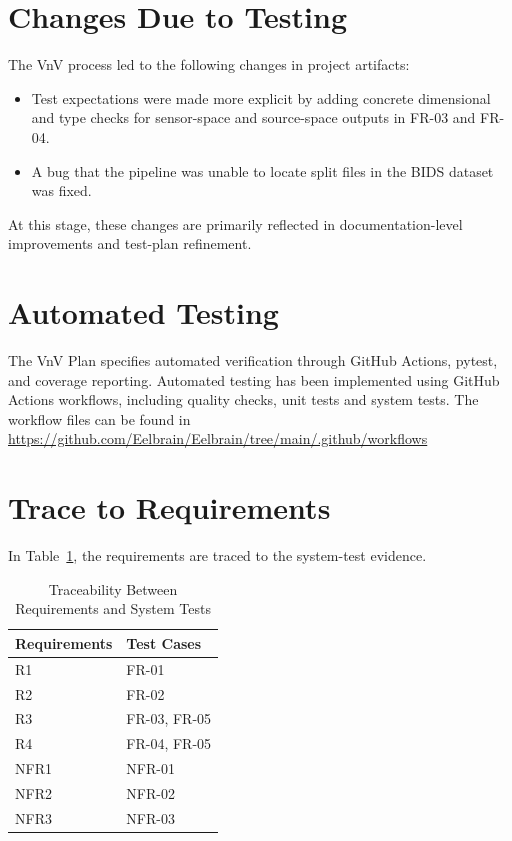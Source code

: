 \documentclass[12pt, titlepage]{article}
\begin{document}
\section{Changes Due to Testing}

The VnV process led to the following changes in project artifacts:
\begin{itemize}
    \item Test expectations were made more explicit by adding concrete dimensional and type checks for sensor-space and source-space outputs in FR-03 and FR-04.
    \item A bug that the pipeline was unable to locate split files in the BIDS dataset was fixed.
\end{itemize}

At this stage, these changes are primarily reflected in documentation-level improvements and test-plan refinement.

\section{Automated Testing}

The VnV Plan specifies automated verification through GitHub Actions, pytest, and coverage reporting.
Automated testing has been implemented using GitHub Actions workflows, including quality checks, unit tests and system tests. The workflow files can be found in \url{https://github.com/Eelbrain/Eelbrain/tree/main/.github/workflows}


\section{Trace to Requirements}
In Table~\ref{tab:requirement_test_trace}, the requirements are traced to the system-test evidence.

\begin{table}[h]
\centering
\begin{tabularx}{0.6\textwidth}{p{3cm}X}
\toprule
    \textbf{Requirements} & \textbf{Test Cases} \\
\midrule
    R1 & FR-01 \\
    R2 & FR-02 \\
    R3 & FR-03, FR-05 \\
    R4 & FR-04, FR-05 \\
    NFR1 & NFR-01 \\
    NFR2 & NFR-02 \\
    NFR3 & NFR-03 \\
\bottomrule
\end{tabularx}
\caption{Traceability Between Requirements and System Tests}
\label{tab:requirement_test_trace}
\end{table}
\end{document}
